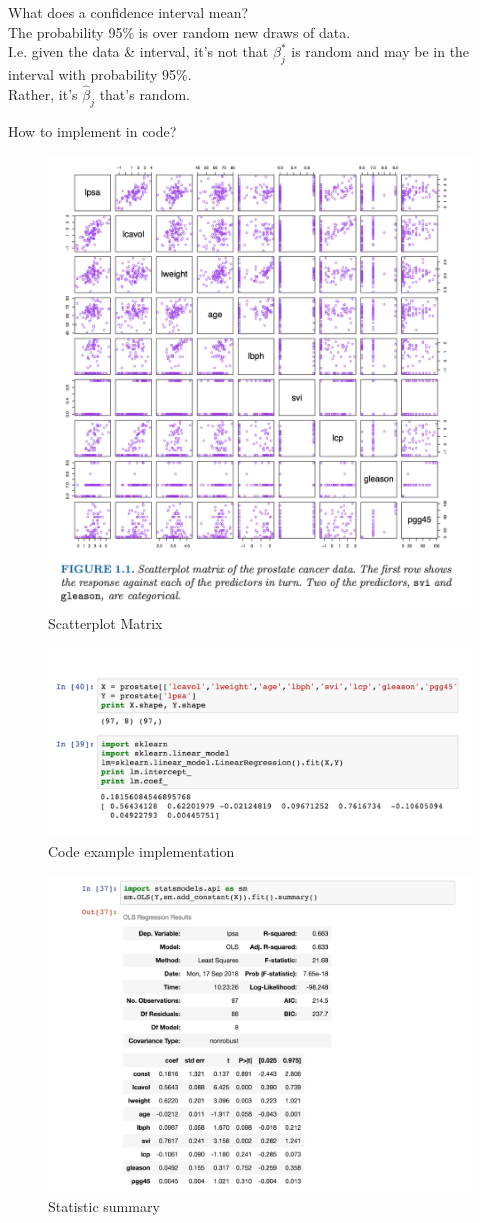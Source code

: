 \documentclass[a4paper]{article}
\newcommand{\bhj}{\widehat{\beta}_j}
\newcommand{\bsj}{\beta^*_j}
\begin{document}
What does a confidence interval mean?\\
The probability 95\% is over random new draws of data.\\
I.e. given the data \& interval, it's not that $\bsj$ is random and may be in the interval with probability 95\%. \\
Rather, it's $\bhj$ that's random.

How to implement in code?
\begin{figure}[H]
	\centering
	\includegraphics[width=.8\textwidth]{f3.png}
	\caption{Scatterplot Matrix}
\end{figure}
\begin{figure}[H]
	\centering
	\includegraphics[width=.8\textwidth]{f4.png}
	\caption{Code example implementation}
\end{figure}
\begin{figure}[H]
	\centering
	\includegraphics[width=.8\textwidth]{f5.png}
	\caption{Statistic summary}
\end{figure}
\end{document}
